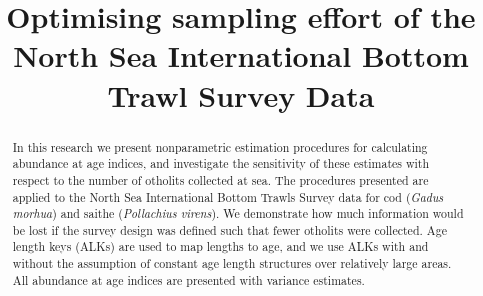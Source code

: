 \documentclass[a4paper 12pt]{article}
\title{\bf 
}
\author{}
\date{}
\numberwithin{equation}{section}
\begin{document}
\title{Optimising sampling effort of the North Sea International Bottom Trawl Survey Data}

\maketitle


\begin{abstract}

In this research we present nonparametric estimation procedures for calculating abundance at age indices, and investigate the sensitivity of these estimates with respect to the number of otholits collected at sea. The procedures presented are applied to the North Sea International Bottom Trawls Survey data for cod (\textit{Gadus morhua}) and saithe (\textit{Pollachius virens}). We demonstrate how much information would be lost if the survey design was defined such that fewer otholits were collected. Age length keys (ALKs) are used to map lengths to age, and we use ALKs with and without the assumption of constant age length structures over relatively large areas. All abundance at age indices are presented with variance estimates. \\

\end{abstract}
\end{document}
